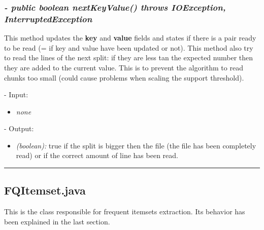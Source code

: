 \documentclass[]{report}
\begin{document}
	\subsubsection*{\textit{\textbf{-} public boolean nextKeyValue() throws IOException, InterruptedException}}   	
	This method updates the \textbf{key} and \textbf{value} fields and states if there is a pair ready to be read (= if key and value have been updated or not). This method also try to read the lines of the next split: if they are less tan the expected number then they are added to the current value. This is to prevent the algorithm to read chunks too small (could cause problems when scaling the support threshold).   
	\begin{description}
		\item - Input:
		\begin{itemize}
			\item \textit{none}
		\end{itemize}
	\end{description}	
	\begin{description}
		\item - Output:
		\begin{itemize}
			\item \textit{(boolean):} true if the split is bigger then the file (the file has been completely read) or if the correct amount of line has been read. 
		\end{itemize}
	\end{description}	
	
	\rule{\textwidth}{0.4pt}
	
	\subsection*{FQItemset.java}
	This is the class responsible for frequent itemsets extraction. Its behavior has been explained in the last section.
	
\end{document}
